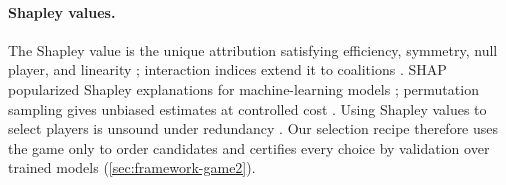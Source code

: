 \paragraph{Shapley values.}
The Shapley value is the unique attribution satisfying efficiency,
symmetry, null player, and linearity \citep{shapley1953value};
interaction indices extend it to coalitions
\citep{grabisch1999axiomatic}. SHAP popularized Shapley explanations
for machine-learning models \citep{lundberg2017shap}; permutation
sampling gives unbiased estimates at controlled cost
\citep{castro2009polynomial,strumbelj2010efficient}. Using Shapley
values to select players is unsound under redundancy
\citep{fryer2021shapley}. Our selection recipe therefore uses the game
only to order candidates and certifies every choice by validation over
trained models (\cref{sec:framework-game2}).
